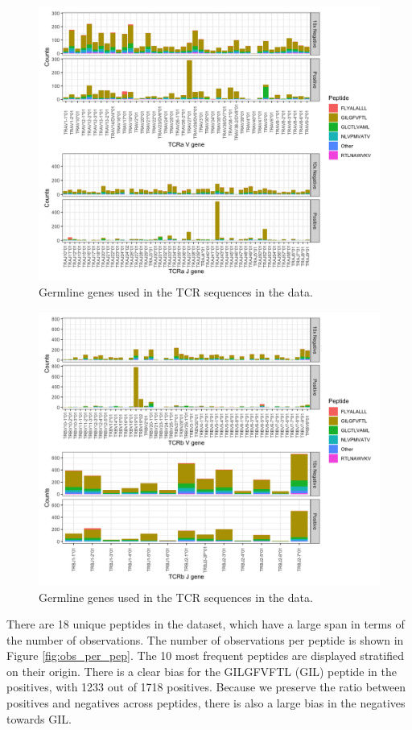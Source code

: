 \begin{figure}
    \centering
    \includegraphics[width=\linewidth]{figures/tcra_genes.png}
    \caption{Germline genes used in the TCR{\textalpha} sequences in the data.}
    \label{fig:tcra_genes}
\end{figure}

\begin{figure}
    \centering
    \includegraphics[width=\linewidth]{figures/tcrb_genes.png}
    \caption{Germline genes used in the TCR{\textbeta} sequences in the data.}
    \label{fig:tcrb_genes}
\end{figure}
\clearpage
There are 18 unique peptides in the dataset, which have a large span in terms of the number of observations. The number of observations per peptide is shown in Figure \ref{fig:obs_per_pep}. The 10 most frequent peptides are displayed stratified on their origin. There is a clear bias for the GILGFVFTL (GIL) peptide in the positives, with 1233 out of 1718 positives. Because we preserve the ratio between positives and negatives across peptides, there is also a large bias in the negatives towards GIL. 


